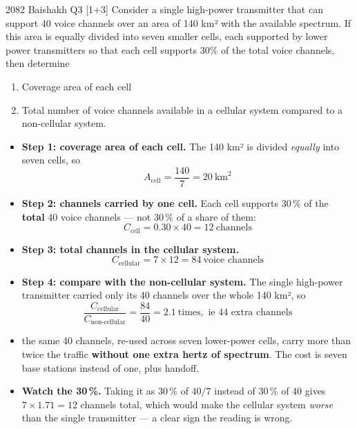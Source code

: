 \begin{asked}{2082 Baishakh \textperiodcentered{} Q3 \textperiodcentered{} [1+3]}
Consider a single high-power transmitter that can support 40 voice channels over an area of
140 km² with the available spectrum. If this area is equally divided into seven smaller cells,
each supported by lower power transmitters so that each cell supports 30\% of the total voice
channels, then determine
\begin{enumerate}[label=\roman*), leftmargin=1.9em]
  \item Coverage area of each cell
  \item Total number of voice channels available in a cellular system compared to a
        non-cellular system.
\end{enumerate}
\end{asked}

\begin{itemize}
  \item \textbf{Step 1: coverage area of each cell.} The 140 km² is divided \emph{equally}
        into seven cells, so
        \[ A_{\text{cell}} = \frac{140}{7} = \boxed{20\ \text{km}^2} \]
  \item \textbf{Step 2: channels carried by one cell.} Each cell supports 30\,\% of the
        \textbf{total} 40 voice channels --- not 30\,\% of a share of them:
        \[ C_{\text{cell}} = 0.30 \times 40 = 12\ \text{channels} \]
  \item \textbf{Step 3: total channels in the cellular system.}
        \[ C_{\text{cellular}} = 7 \times 12 = \boxed{84\ \text{voice channels}} \]
  \item \textbf{Step 4: compare with the non-cellular system.} The single high-power
        transmitter carried only its 40 channels over the whole 140 km², so
        \[ \frac{C_{\text{cellular}}}{C_{\text{non-cellular}}} = \frac{84}{40}
           = \boxed{2.1\ \text{times}, \text{ ie 44 extra channels}} \]
  \item {} the same 40 channels, re-used across seven
        lower-power cells, carry more than twice the traffic \textbf{without one extra hertz
        of spectrum}. The cost is seven base stations instead of one, plus handoff.
  \item \textbf{Watch the 30\,\%.} Taking it as 30\,\% of $40/7$ instead of 30\,\% of 40 gives
        $7 \times 1.71 = 12$ channels total, which would make the cellular system
        \emph{worse} than the single transmitter --- a clear sign the reading is wrong.
\end{itemize}

